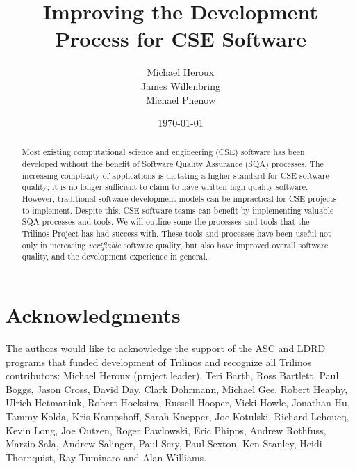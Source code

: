 \documentclass[12pt,relax]{article}
\title{Improving the Development Process for CSE Software}
\author{
Michael Heroux\\
James Willenbring\\
Michael Phenow\\
}
\date{\today} %
\begin{document}
\maketitle


\begin{abstract}

Most existing computational science and engineering (CSE) software has been 
developed without the benefit of Software Quality Assurance (SQA) processes.
The increasing complexity of applications is dictating a higher standard for 
CSE software quality; it is no longer sufficient to claim to have 
written high quality software.  However, traditional
software development models can be impractical for CSE projects to implement.
Despite this, CSE software teams can benefit by implementing
valuable SQA processes and tools.  We will outline some the
processes and tools that the Trilinos Project has had success with.  These 
tools and processes have been useful not only in increasing 
\textit{verifiable} software quality, but also have improved 
overall software quality, and the development experience in 
general.

\end{abstract}

\clearpage


\section*{Acknowledgments}

The authors would like to acknowledge the support of the ASC and LDRD programs 
that funded development of Trilinos and recognize all Trilinos contributors:
Michael Heroux (project leader), Teri Barth, Ross Bartlett, Paul Boggs, Jason
Cross, David Day, Clark Dohrmann, Michael Gee, Robert Heaphy, Ulrich Hetmaniuk, 
Robert Hoekstra, Russell Hooper, Vicki Howle, Jonathan Hu, Tammy Kolda, Kris
Kampshoff, Sarah Knepper, Joe Kotulski, Richard Lehoucq, Kevin Long, Joe
Outzen, Roger Pawlowski, Eric Phipps, Andrew Rothfuss, Marzio Sala, Andrew
Salinger, Paul Sery, Paul Sexton, Ken Stanley, Heidi Thornquist, Ray Tuminaro
and Alan Williams.

\clearpage
\tableofcontents

\clearpage
\end{document}
